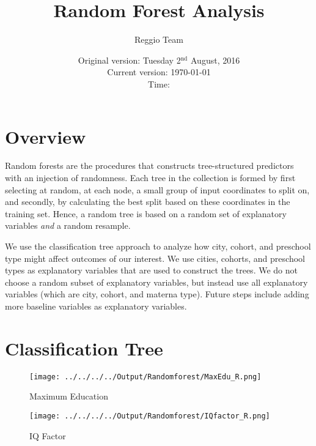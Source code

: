\documentclass[12pt]{article}
\begin{document}
\title{Random Forest Analysis}
\author{Reggio Team}
\date{Original version: Tuesday 2$^{\text{nd}}$ August, 2016 \\ Current version: \today \\ \vspace{1em} Time: \currenttime}
\maketitle

\doublespacing

\section{Overview}

Random forests are the procedures that constructs tree-structured predictors with an injection of randomness. Each tree in the collection is formed by first selecting at random, at each node, a small group of input coordinates to split on, and secondly, by calculating the best split based on these coordinates in the training set. Hence, a random tree is based on a random set of explanatory variables \textit{and} a random resample. 

We use the classification tree approach to analyze how city, cohort, and preschool type might affect outcomes of our interest. We use cities, cohorts, and preschool types as explanatory variables that are used to construct the trees. We do not choose a random subset of explanatory variables, but instead use all explanatory variables (which are city, cohort, and materna type). Future steps include adding more baseline variables as explanatory variables.

\section{Classification Tree} 

\begin{landscape}
\begin{figure}[H]
	\begin{center}
	\caption{Maximum Education}
	
	\texttt{[image: ../../../../Output/Randomforest/MaxEdu\_R.png]}

	\end{center}
 \end{figure} 
 
 \begin{figure}[H]
	\begin{center}
	\caption{IQ Factor}
	
	\texttt{[image: ../../../../Output/Randomforest/IQfactor\_R.png]}

	\end{center}
 \end{figure} 

\end{landscape} 
 
\end{document}
